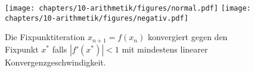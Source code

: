 %
%
%
\begin{figure}
\centering
\texttt{[image: chapters/10-arithmetik/figures/normal.pdf]}
\texttt{[image: chapters/10-arithmetik/figures/negativ.pdf]}
\caption{Die Fixpunktiteration $x_{n+1}=f(x_n)$ konvergiert gegen
den Fixpunkt $x^*$ falls $|f'(x^*)|<1$ mit
mindestens linearer Konvergenzgeschwindigkeit.
\label{buch:figure:fixpunkt:normal}}
\end{figure}
